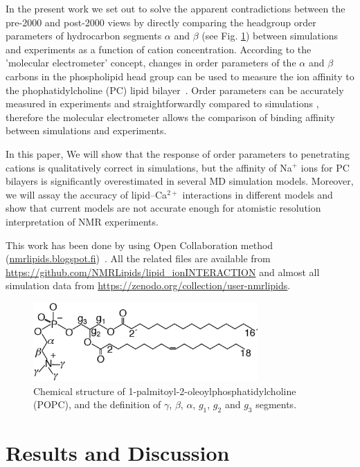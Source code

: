 \documentclass[twoside,twocolumn,9pt]{article}
\begin{document}
In the present work we set out to solve the apparent contradictions
between the pre-2000 and post-2000 views
by directly comparing the headgroup order parameters of hydrocarbon segments
$\alpha$ and $\beta$ (see Fig. \ref{POPCstructure}) between simulations
and experiments as a function of cation concentration. 
According to the 'molecular electrometer' concept, changes in order parameters of the $\alpha$ and $\beta$ carbons 
in the phospholipid head group can be used to measure the ion affinity to the 
phophatidylcholine (PC) lipid bilayer~\cite{akutsu81,altenbach84,seelig87,scherer89}.
Order parameters can be accurately measured in experiments and straightforwardly compared to 
simulations \cite{ollila16}, therefore the molecular electrometer allows the 
comparison of binding affinity between simulations and experiments. 

In this paper, We will show that the response of order parameters to penetrating cations
is qualitatively correct in simulations, but the affinity of Na$^{+}$ ions for PC bilayers
is significantly overestimated in several MD simulation models.
Moreover, we will assay the accuracy of lipid--Ca$^{2+}$ interactions 
in different models and show that current models are not accurate enough
for atomistic resolution interpretation of NMR experiments. 

This work has been done by using Open Collaboration method (\url{nmrlipids.blogspot.fi})~\cite{botan15}.
All the related files are available from \url{https://github.com/NMRLipids/lipid_ionINTERACTION} and
almost all simulation data from \url{https://zenodo.org/collection/user-nmrlipids}.

\begin{figure}[]
  \centering
  \includegraphics[width=8.6cm]{../Fig/POPCstructure.eps}

  \caption{\label{POPCstructure}
    Chemical structure of 1-palmitoyl-2-oleoylphosphatidylcholine (POPC), and the definition of $\gamma$, $\beta$, $\alpha$, $g_1$, $g_2$ and $g_3$ segments.}
  
\end{figure}


\section{Results and Discussion}
\end{document}
